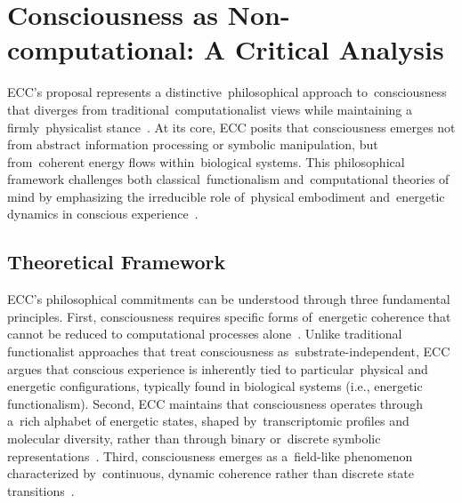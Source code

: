 \section{Consciousness as Non-computational: A Critical Analysis}

ECC's proposal represents a distinctive~philosophical approach to~consciousness that diverges from traditional~computationalist views while maintaining a firmly~physicalist stance~\cite{piccinini2020neurocognitive,anderson2024physical}. At its core, ECC posits that consciousness emerges not from abstract information processing or symbolic manipulation, but from~coherent energy flows within~biological systems. This philosophical framework challenges both classical~functionalism and~computational theories of mind by emphasizing the irreducible role of~physical embodiment and~energetic dynamics in conscious experience~\cite{thompson2001radical,clark2013whatever}.

\subsection*{Theoretical Framework}

ECC's philosophical commitments can be understood through three fundamental principles. First, consciousness requires specific forms of~energetic coherence that cannot be reduced to computational processes alone~\cite{van1995might,hunt2024electromagnetic}. Unlike traditional functionalist approaches that treat consciousness as~substrate-independent, ECC argues that conscious experience is inherently tied to particular~physical and energetic configurations, typically found in biological systems (i.e., energetic functionalism). Second, ECC maintains that consciousness operates through a~rich alphabet of energetic states, shaped by~transcriptomic profiles and molecular diversity, rather than through binary or~discrete symbolic representations~\cite{levin2019computational}. Third, consciousness emerges as a~field-like phenomenon characterized by~continuous, dynamic coherence rather than discrete state transitions~\cite{McFadden2020,pinotsis2023cytoelectric}.

